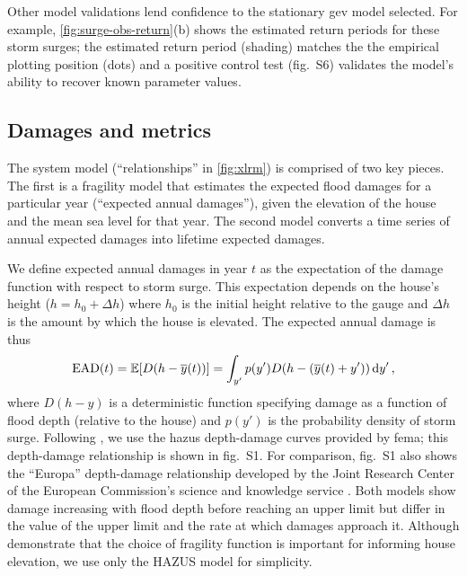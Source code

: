 \documentclass{agujournal2019}
\begin{document}
Other model validations lend confidence to the stationary \gls{gev} model selected.
For example, \cref{fig:surge-obs-return}(b) shows the estimated return periods for these storm surges; the estimated return period  (shading) matches the the empirical plotting position (dots) and a positive control test (fig.~S6) validates the model's ability to recover known parameter values.

\subsection{Damages and metrics}\label{sec:case-metrics}

The system model (``relationships'' in \cref{fig:xlrm}) is comprised of two key pieces.
The first is a fragility model that estimates the expected flood damages for a particular year (``expected annual damages''), given the elevation of the house and the mean sea level for that year.
The second model converts a time series of annual expected damages into lifetime expected damages.

We define expected annual damages in year $t$ as the expectation of the damage function with respect to storm surge.
This expectation depends on the house's height ($h = h_0 + \Delta h$) where $h_0$ is the initial height relative to the gauge and $\Delta h$ is the amount by which the house is elevated.
The expected annual damage is thus
\begin{equation}\label{eq:ead}
  \textrm{EAD}(t) = \mathbb{E}[D \qty(h-\overline{y}(t))] = \int_{y'} p(y') D \qty(h - \qty(\overline{y}(t) + y')) \dd{y'},
\end{equation}
where $D(h-y)$ is a deterministic function specifying damage as a function of flood depth (relative to the house) and $p(y')$ is the probability density of storm surge.
Following , we use the \gls{hazus} depth-damage curves provided by \gls{fema}; this depth-damage relationship is shown in fig.~S1.
For comparison, fig.~S1 also shows the ``Europa'' depth-damage relationship developed by the Joint Research Center of the European Commission's science and knowledge service \cite{huizinga_depthdamage:2016}.
Both models show damage increasing with flood depth before reaching an upper limit but differ in the value of the upper limit and the rate at which damages approach it.
Although  demonstrate that the choice of fragility function is important for informing house elevation, we use only the HAZUS model for simplicity.
\end{document}
